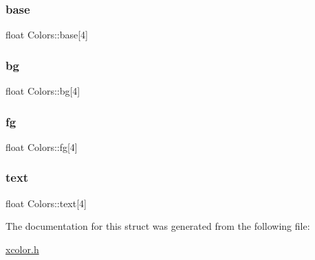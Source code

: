 \subsubsection{\texorpdfstring{base}{base}}
{\footnotesize\ttfamily float Colors\+::base\mbox{[}4\mbox{]}}

\mbox{\label{structColors_a38294c28d52e4a10abcaf322dff25a97}} 
\subsubsection{\texorpdfstring{bg}{bg}}
{\footnotesize\ttfamily float Colors\+::bg\mbox{[}4\mbox{]}}

\mbox{\label{structColors_afbcf70113bd28d362a23ac5fc6058924}} 
\subsubsection{\texorpdfstring{fg}{fg}}
{\footnotesize\ttfamily float Colors\+::fg\mbox{[}4\mbox{]}}

\mbox{\label{structColors_aca2846df5e653cda1cb1ca97ea1b3e63}} 
\subsubsection{\texorpdfstring{text}{text}}
{\footnotesize\ttfamily float Colors\+::text\mbox{[}4\mbox{]}}



The documentation for this struct was generated from the following file\+:\begin{DoxyCompactItemize}
\item 
\hyperlink{xcolor_8h}{xcolor.\+h}\end{DoxyCompactItemize}
